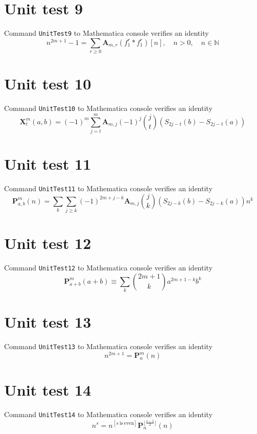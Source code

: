 \documentclass[12pt, letterpaper]{amsart}
\theoremstyle{definition}
\theoremstyle{remark}
\numberwithin{equation}{section}
\begin{document}
\section*{Unit test 9}
Command \verb"UnitTest9" to Mathematica console verifies an identity
\begin{equation*}
n^{2m+1} - 1 = \sum_{r\geq 0} \mathbf{A}_{m,r} (f_{1}^{r} \ast f_{1}^{r})[n], \quad n>0, \quad n\in\mathbb{N}
\end{equation*}
\section*{Unit test 10}
Command \verb"UnitTest10" to Mathematica console verifies an identity
\begin{equation*}
\mathbf{X}^{m}_{t}(a,b) = (-1)^m \sum_{j=t}^m \mathbf{A}_{m,j} (-1)^j \binom{j}{t} (S_{2j-t} (b) - S_{2j-t} (a))
\end{equation*}
\section*{Unit test 11}
Command \verb"UnitTest11" to Mathematica console verifies an identity
\begin{equation*}
\mathbf{P}^{m}_{a,b}(n) = \sum_{k} \sum\limits_{j\geq k}(-1)^{2m+j-k} \mathbf{A}_{m,j} \binom{j}{k}(S_{2j-k}(b)-S_{2j-k}(a)) n^k
\end{equation*}
\section*{Unit test 12}
Command \verb"UnitTest12" to Mathematica console verifies an identity
\begin{equation*}
\mathbf{P}^{m}_{a+b}(a+b) \equiv \sum_{k} \binom{2m+1}{k} a^{2m+1-k} b^k
\end{equation*}
\section*{Unit test 13}
Command \verb"UnitTest13" to Mathematica console verifies an identity
\begin{equation*}
n^{2m+1} = \mathbf{P}^{m}_{n}(n)
\end{equation*}
\section*{Unit test 14}
Command \verb"UnitTest14" to Mathematica console verifies an identity
\begin{equation*}
n^s
= n^{[s \ \mathrm{is} \ \mathrm{even}]} \mathbf{P}^{\lfloor \tfrac{s-1}{2} \rfloor}_{n}(n)
\end{equation*}
\end{document}
